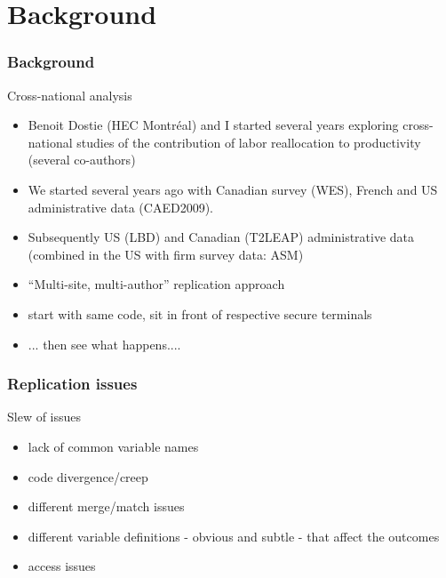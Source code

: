 \section{Background}

\begin{frame}
\frametitle{Background}
\begin{block}{Cross-national analysis}
\begin{itemize}[<+->]
\item Benoit Dostie (HEC Montr\'eal) and I started several years exploring cross-national studies of the contribution of labor reallocation to productivity (several co-authors)
\item We started several years ago with Canadian survey (WES), French and US administrative data (CAED2009).
\item Subsequently US (LBD) and Canadian (T2LEAP) administrative data (combined in the US with firm survey data: ASM)
\item ``Multi-site, multi-author'' replication approach
\item start with same code, sit in front of respective secure terminals
\item ... then see what happens....
\end{itemize}
\end{block}
\end{frame}

\begin{frame}
\frametitle{Replication issues}
\begin{block}{Slew of issues}
\begin{itemize}[<+->]
\item lack of common variable names
\item code divergence/creep
\item different merge/match issues 
\item different variable definitions - obvious and subtle - that affect the outcomes
\item access issues
\end{itemize}
\end{block}
\end{frame}

